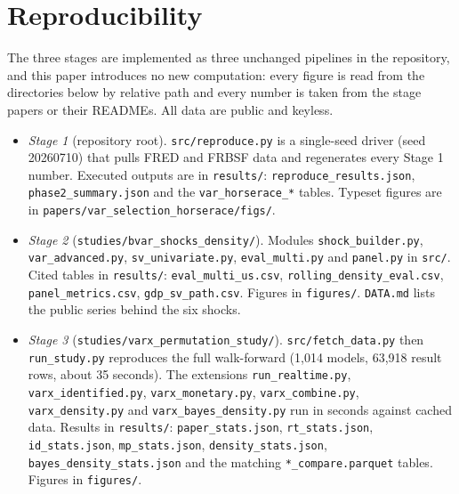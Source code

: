 \documentclass[conference]{IEEEtran}
\begin{document}
\section{Reproducibility}
The three stages are implemented as three unchanged pipelines in the repository, and this paper introduces no new computation: every figure is read from the directories below by relative path and every number is taken from the stage papers or their READMEs. All data are public and keyless.
\begin{itemize}\raggedright
\item \emph{Stage 1} (repository root). \texttt{src/reproduce.py} is a single-seed driver (seed 20260710) that pulls FRED and FRBSF data and regenerates every Stage 1 number. Executed outputs are in \texttt{results/}: \texttt{reproduce\_results.json}, \texttt{phase2\_summary.json} and the \texttt{var\_horserace\_*} tables. Typeset figures are in \texttt{papers/var\_selection\_horserace/figs/}.
\item \emph{Stage 2} (\texttt{studies/bvar\_shocks\_density/}). Modules \texttt{shock\_builder.py}, \texttt{var\_advanced.py}, \texttt{sv\_univariate.py}, \texttt{eval\_multi.py} and \texttt{panel.py} in \texttt{src/}. Cited tables in \texttt{results/}: \texttt{eval\_multi\_us.csv}, \texttt{rolling\_density\_eval.csv}, \texttt{panel\_metrics.csv}, \texttt{gdp\_sv\_path.csv}. Figures in \texttt{figures/}. \texttt{DATA.md} lists the public series behind the six shocks.
\item \emph{Stage 3} (\texttt{studies/varx\_permutation\_study/}). \texttt{src/fetch\_data.py} then \texttt{run\_study.py} reproduces the full walk-forward (1,014 models, 63,918 result rows, about 35 seconds). The extensions \texttt{run\_realtime.py}, \texttt{varx\_identified.py}, \texttt{varx\_monetary.py}, \texttt{varx\_combine.py}, \texttt{varx\_density.py} and \texttt{varx\_bayes\_density.py} run in seconds against cached data. Results in \texttt{results/}: \texttt{paper\_stats.json}, \texttt{rt\_stats.json}, \texttt{id\_stats.json}, \texttt{mp\_stats.json}, \texttt{density\_stats.json}, \texttt{bayes\_density\_stats.json} and the matching \texttt{*\_compare.parquet} tables. Figures in \texttt{figures/}.

\end{itemize}
\end{document}
